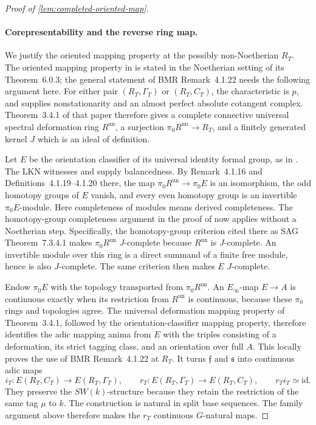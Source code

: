 \begin{proof}[Proof of \cref{lem:completed-oriented-map}]
\paragraph{Corepresentability and the reverse ring map.}
We justify the oriented mapping property at the possibly
non-Noetherian \(R_T\). The oriented mapping property in
\cite[Remark~6.0.7]{LurieEllipticII2018} is stated in the Noetherian
setting of its Theorem~6.0.3; the general statement of BMR
Remark~4.1.22 needs the following argument here. For either pair
\((R_T,\Gamma_T)\) or \((R_T,C_T)\), the characteristic is \(p\), and
\cite[Remark~3.4.2]{LurieEllipticII2018} supplies nonstationarity and an
almost perfect absolute cotangent complex. Theorem~3.4.1 of that paper
therefore gives a complete connective universal spectral deformation
ring \(R^{\mathrm{un}}\), a surjection
\(\pi_0R^{\mathrm{un}}\to R_T\), and a finitely generated kernel \(J\)
which is an ideal of definition.

Let \(E\) be the orientation classifier of its universal identity formal
group, as in \cite[Construction~4.1.17 and Definition~4.1.20]{BMR2026}.
The LKN witnesses and \cite[Definition~4.2.1 and Theorem~4.3.8]{BMR2026}
supply balancedness. By Remark~4.1.16 and Definitions~4.1.19--4.1.20
there, the map \(\pi_0R^{\mathrm{un}}\to\pi_0E\) is an isomorphism, the
odd homotopy groups of \(E\) vanish, and every even homotopy group is an
invertible \(\pi_0E\)-module. Here completeness of modules means
derived completeness. The homotopy-group completeness argument
in the proof of \cite[Corollary~6.0.5]{LurieEllipticII2018} now applies
without a Noetherian step. Specifically, the homotopy-group criterion
cited there as SAG Theorem~7.3.4.1 makes \(\pi_0R^{\mathrm{un}}\) \(J\)-complete because
\(R^{\mathrm{un}}\) is \(J\)-complete. An invertible module over this
ring is a direct summand of a finite free module, hence is also
\(J\)-complete. The same criterion then makes \(E\) \(J\)-complete.

Endow \(\pi_0E\) with the topology transported from
\(\pi_0R^{\mathrm{un}}\). An \(E_\infty\)-map \(E\to A\) is continuous
exactly when its restriction from \(R^{\mathrm{un}}\) is continuous,
because these \(\pi_0\) rings and topologies agree. The universal
deformation mapping property of Theorem~3.4.1, followed by the
orientation-classifier mapping property, therefore identifies the adic
mapping anima from \(E\) with the triples consisting of a deformation,
its strict tagging class, and an orientation over full \(A\). This
locally proves the use of BMR Remark~4.1.22 at \(R_T\).
It turns \(\mathfrak f\) and \(\mathfrak s\) into continuous adic maps
\[
 i_T:E(R_T,C_T)\longrightarrow E(R_T,\Gamma_T),\qquad
 r_T:E(R_T,\Gamma_T)\longrightarrow E(R_T,C_T),
 \qquad r_Ti_T\simeq\mathrm{id}.
\]
They preserve the \(SW(k)\)-structure because they retain the restriction
of the same tag \(\mu\) to \(k\). The construction is natural in split
base sequences. The family argument above therefore makes the \(r_T\)
continuous \(G\)-natural maps.


\end{proof}
